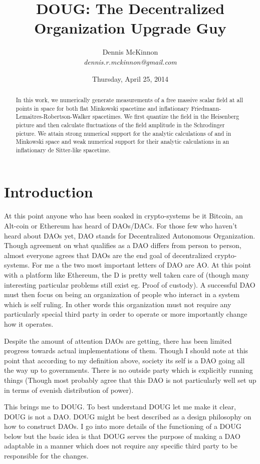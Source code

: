 \documentclass[]{article}
\author{Dennis McKinnon\\
\textit{dennis.r.mckinnon@gmail.com}}
\title{DOUG: The Decentralized Organization Upgrade Guy}
\date{Thursday, April 25, 2014}
\begin{document}
\maketitle

\begin{abstract}
  In this work, we numerically generate measurements of a free massive
  scalar field at all points in space for both flat Minkowski
  spacetime and inflationary Friedmann-Lemaitres-Robertson-Walker
  spacetimes. We first quantize the field in the Heisenberg picture and
  then calculate fluctuations of the field amplitude in the
  Schrodinger picture. We attain strong numerical support for the
  analytic calculations of \cite{Kempf} and \cite{MukhanovWinitzki} in
  Minkowski space and weak numerical support for their analytic
  calculations in an inflationary de Sitter-like spacetime.
\end{abstract}

\section{Introduction}
\label{sec:intro}

At this point anyone who has been soaked in crypto-systems be it Bitcoin, an Alt-coin or Ethereum has heard of DAOs/DACs. For those few who haven't heard about DAOs yet, DAO stands for Decentralized Autonomous Organization. Though agreement on what qualifies as a DAO differs from person to person, almost everyone agrees that DAOs are the end goal of decentralized crypto-systems. For me a the two most important letters of DAO are AO. At this point with a platform like Ethereum, the D is pretty well taken care of (though many interesting particular problems still exist eg. Proof of custody). A successful DAO must then focus on being an organization of people who interact in a system which is self ruling. In other words this organization must not require any particularly special third party in order to operate or more importantly change how it operates.

Despite the amount of attention DAOs are getting, there has been limited progress towards actual implementations of them. Though I should note at this point that according to my definition above, society its self is a DAO going all the way up to governments. There is no outside party which is explicitly running things (Though most probably agree that this DAO is not particularly well set up in terms of evenish distribution of power).

This brings me to DOUG. To best understand DOUG let me make it clear, DOUG is not a DAO. DOUG might be best described as a design philosophy on how to construct DAOs. I go into more details of the functioning of a DOUG below but the basic idea is that DOUG serves the purpose of making a DAO adaptable in a manner which does not require any specific third party to be responsible for the changes.
\end{document}
